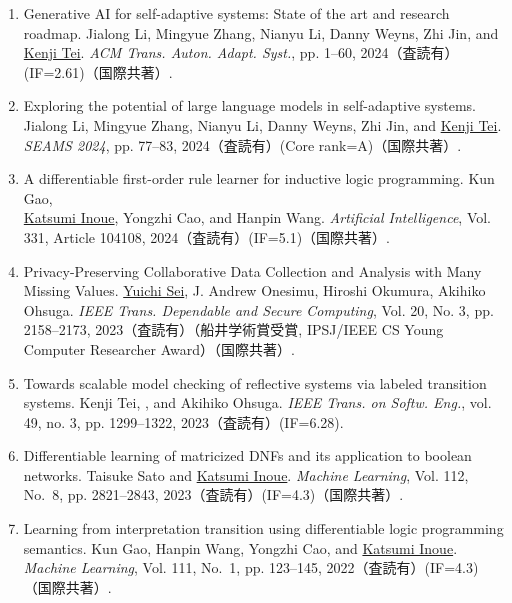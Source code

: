 \documentclass[11pt,a4j,dvipdfmx]{jarticle} 					%
\newcommand{\研究課題名}{大量の脆弱性・攻撃手段・パッチの依存関係を考慮した証明付き修正計画の自動生成}
\newcommand{\研究機関名}{電気通信大学}
\newcommand{\研究代表者氏名}{田原 康之}
\newcommand{\研究期間の最終元号年度}{12}  %
\begin{document}
\begin{enumerate}
\item\label{tei24-2} Generative AI for self-adaptive systems: State of the art and research roadmap.
  \setulsep{0pt} Jialong Li, Mingyue Zhang, Nianyu Li, Danny Weyns, Zhi Jin, and \ul{Kenji Tei}.
  {\em ACM Trans. Auton. Adapt. Syst.}, pp. 1--60, 2024（査読有）(IF=2.61)（国際共著）.

\item\label{tei24-1} Exploring the potential of large language models in self-adaptive systems.
  \setulsep{0pt} Jialong Li, Mingyue Zhang, Nianyu Li, Danny Weyns, Zhi Jin, and \ul{Kenji Tei}.
  {\em {SEAMS} 2024}, pp. 77--83,  2024（査読有）(Core rank=A)（国際共著）.

\item\label{inoue24} A differentiable first-order rule learner for inductive logic programming.
  \setulsep{0pt} Kun Gao,\\
  \ul{Katsumi Inoue}, Yongzhi Cao, and Hanpin Wang.
  {\em Artificial Intelligence}, Vol. 331, Article 104108, 2024（査読有）(IF=5.1)（国際共著）.
  
\item\label{sei23} Privacy-Preserving Collaborative Data Collection and Analysis with Many Missing Values.
  \setulsep{0pt} \ul{Yuichi Sei}, J. Andrew Onesimu, Hiroshi Okumura, Akihiko Ohsuga.
  \emph{IEEE Trans. Dependable and Secure Computing}, Vol. 20, No. 3, pp. 2158--2173, 2023（査読有）（船井学術賞受賞, IPSJ/IEEE CS Young Computer Researcher Award）（国際共著）.

\item\label{tei23} Towards scalable model checking of reflective systems via labeled transition systems.
  \setulsep{0pt} Kenji Tei, , and Akihiko Ohsuga.
  {\em IEEE Trans. on Softw. Eng.}, vol. 49, no. 3, pp. 1299--1322, 2023（査読有）(IF=6.28).

\item\label{inoue23}
  Differentiable learning of matricized DNFs and its application to boolean networks.
  \setulsep{0pt} Taisuke Sato and \ul{Katsumi Inoue}.
  {\em Machine Learning}, Vol. 112, No.~8, pp. 2821--2843, 2023（査読有）(IF=4.3)（国際共著）.

\item\label{inoue22-2}
  Learning from interpretation transition using differentiable logic programming semantics.
  \setulsep{0pt} Kun Gao, Hanpin Wang, Yongzhi Cao, and \ul{Katsumi Inoue}.
  {\em Machine Learning}, Vol. 111, No.~1, pp. 123--145, 2022（査読有）(IF=4.3)（国際共著）.
  

\end{enumerate}
\end{document}
